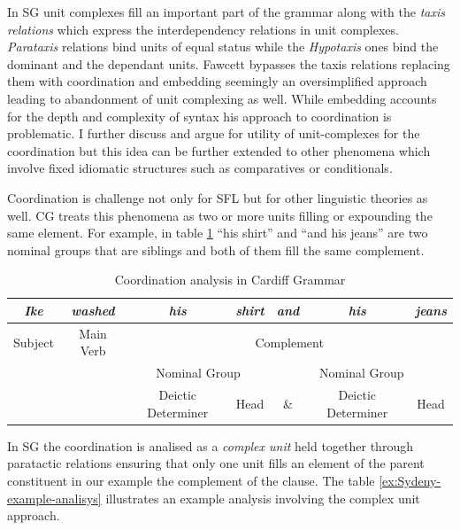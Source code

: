 \label{sec:coordination}
In SG unit complexes fill an important part of the grammar along with the \textit{taxis relations} which express the interdependency relations in unit complexes. \textit{Parataxis} relations bind units of equal status while the \textit{Hypotaxis} ones bind the dominant and  the dependant units. Fawcett bypasses the taxis relations replacing them with coordination and embedding \citep[p.~271]{Fawcett2000} seemingly an oversimplified approach leading to abandonment of unit complexing as well. While embedding accounts for the depth and complexity of syntax his approach to coordination is problematic. I further discuss and argue for utility of unit-complexes for the coordination but this idea can be further extended to other phenomena which involve fixed idiomatic structures such as comparatives or conditionals.

Coordination is challenge not only for SFL but for other linguistic theories as well. CG treats this phenomena as two or more units filling or expounding the same element. For example, in table \ref{ex:Cardiff-example-analisys} ``his shirt'' and ``and his jeans'' are two nominal groups that are siblings and both of them fill the same complement. 

\begin{table}[h]
	\centering
	\begin{tabular}{|c|c|c|c|c|c|c|}
		\hline
		\textit{Ike} & \textit{washed} & \textit{his} & \textit{shirt} & \textit{and} & \textit{his} & \textit{jeans} \\ \hline
		Subject         & Main Verb               & \multicolumn{5}{c|}{Complement}                                                    \\ \hline
		&                 & \multicolumn{2}{c|}{Nominal Group}      & \multicolumn{3}{c|}{Nominal Group}                     \\ \hline
		&                 & Deictic Determiner           & Head              & \&           & Deictic Determiner           & Head              \\ \hline
	\end{tabular}
	\caption{Coordination analysis in Cardiff Grammar}
	\label{ex:Cardiff-example-analisys}
\end{table}

In SG the coordination is analised as a \textit{complex unit} held together through paratactic relations ensuring that only one unit fills an element of the parent constituent in our example the complement of the clause. The table \ref{ex:Sydeny-example-analisys} illustrates an example analysis involving the complex unit approach. 

